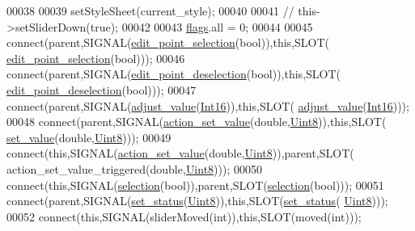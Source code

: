 \begin{DoxyCode}
00038 
00039      setStyleSheet(current\_style);
00040 
00041     \textcolor{comment}{// this->setSliderDown(true);}
00042 
00043     \hyperlink{a00077_ade6449558d429b66e5ed1381bc9b9060}{flags}.all = 0;
00044 
00045     connect(parent,SIGNAL(\hyperlink{a00077_adeebaace74ff3add2acd9147e96fc0a6}{edit\_point\_selection}(\textcolor{keywordtype}{bool})),\textcolor{keyword}{this},SLOT(
      \hyperlink{a00077_adeebaace74ff3add2acd9147e96fc0a6}{edit\_point\_selection}(\textcolor{keywordtype}{bool})));
00046     connect(parent,SIGNAL(\hyperlink{a00077_a105dff1f3ae7cfdcfabacd013428a501}{edit\_point\_deselection}(\textcolor{keywordtype}{bool})),\textcolor{keyword}{this},SLOT(
      \hyperlink{a00077_a105dff1f3ae7cfdcfabacd013428a501}{edit\_point\_deselection}(\textcolor{keywordtype}{bool})));
00047     connect(parent,SIGNAL(\hyperlink{a00077_a521ac5143857dd652a0bafa77389fa81}{adjust\_value}(\hyperlink{a00004_a3985266aecb120f269789241c170850c}{Int16})),\textcolor{keyword}{this},SLOT(
      \hyperlink{a00077_a521ac5143857dd652a0bafa77389fa81}{adjust\_value}(\hyperlink{a00004_a3985266aecb120f269789241c170850c}{Int16})));
00048     connect(parent,SIGNAL(\hyperlink{a00077_a886f07f2c612121bec703581f9398a10}{action\_set\_value}(\textcolor{keywordtype}{double},\hyperlink{a00004_a979e3e23b9a449e69ab6a8a83b6042f8}{Uint8})),\textcolor{keyword}{this},SLOT(
      \hyperlink{a00077_ae3010d3de02715db2f443560d7d2a27b}{set\_value}(\textcolor{keywordtype}{double},\hyperlink{a00004_a979e3e23b9a449e69ab6a8a83b6042f8}{Uint8})));
00049     connect(\textcolor{keyword}{this},SIGNAL(\hyperlink{a00077_a886f07f2c612121bec703581f9398a10}{action\_set\_value}(\textcolor{keywordtype}{double},\hyperlink{a00004_a979e3e23b9a449e69ab6a8a83b6042f8}{Uint8})),parent,SLOT(
      action\_set\_value\_triggered(\textcolor{keywordtype}{double},\hyperlink{a00004_a979e3e23b9a449e69ab6a8a83b6042f8}{Uint8})));
00050     connect(\textcolor{keyword}{this},SIGNAL(\hyperlink{a00077_a66bf875d43a16cf37527ab75c439fd8e}{selection}(\textcolor{keywordtype}{bool})),parent,SLOT(\hyperlink{a00077_a66bf875d43a16cf37527ab75c439fd8e}{selection}(\textcolor{keywordtype}{bool})));
00051     connect(parent,SIGNAL(\hyperlink{a00077_a567902754e43310fe921b74c9d1862dd}{set\_status}(\hyperlink{a00004_a979e3e23b9a449e69ab6a8a83b6042f8}{Uint8})),\textcolor{keyword}{this},SLOT(\hyperlink{a00077_a567902754e43310fe921b74c9d1862dd}{set\_status}(
      \hyperlink{a00004_a979e3e23b9a449e69ab6a8a83b6042f8}{Uint8})));
00052     connect(\textcolor{keyword}{this},SIGNAL(sliderMoved(\textcolor{keywordtype}{int})),\textcolor{keyword}{this},SLOT(moved(\textcolor{keywordtype}{int})));

\end{DoxyCode}
